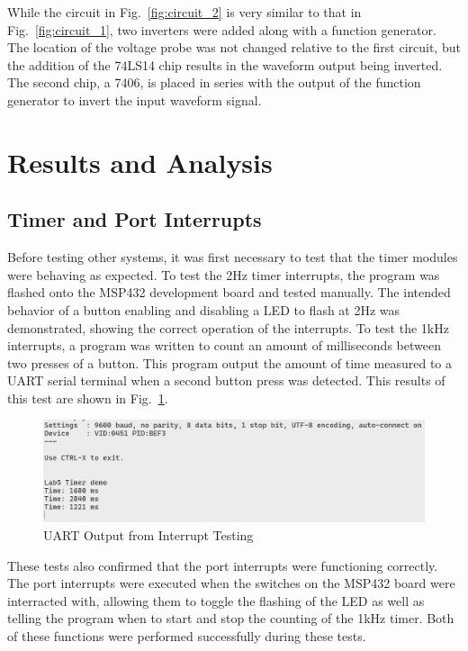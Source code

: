 \documentclass[conference]{IEEEtran}
\begin{document}
While the circuit in Fig.~\ref{fig:circuit_2} is very similar to that in Fig.~\ref{fig:circuit_1}, two inverters were added along
with a function generator. The location of the voltage probe was not changed relative to the first circuit, but the addition of the
74LS14 chip results in the waveform output being inverted. The second chip, a 7406, is placed in series with the output of the function
generator to invert the input waveform signal.

\section{Results and Analysis}

\subsection{Timer and Port Interrupts}

Before testing other systems, it was first necessary to test that the timer
modules were behaving as expected. To test the 2Hz timer interrupts, the
program was flashed onto the MSP432 development board and tested manually.
The intended behavior of a button enabling and disabling a LED to flash at
2Hz was demonstrated, showing the correct operation of the interrupts. To
test the 1kHz interrupts, a program was written to count an amount of
milliseconds between two presses of a button. This program output the amount
of time measured to a UART serial terminal when a second button press was
detected. This results of this test are shown in Fig.~\ref{part1terminal}.

\begin{figure}
    \centering
    \includegraphics[width=\linewidth,decodearray={1 0 1 0 1 0}]{images/part1terminal.png}
    \caption{UART Output from Interrupt Testing}
    \label{part1terminal}
\end{figure}

These tests also confirmed that the port interrupts were functioning
correctly. The port interrupts were executed when the switches on the
MSP432 board were interracted with, allowing them to toggle the flashing
of the LED as well as telling the program when to start and stop the
counting of the 1kHz timer. Both of these functions were performed
successfully during these tests.
\end{document}
